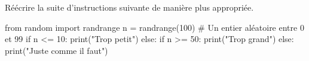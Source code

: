 \question Réécrire la suite d'instructions suivante de manière plus appropriée.
\begin{pyverbatim}
from random import randrange
n = randrange(100) # Un entier aléatoire entre 0 et 99
if n <= 10:
    print("Trop petit")
else:
    if n >= 50:
        print("Trop grand")
    else:
        print("Juste comme il faut")
\end{pyverbatim}